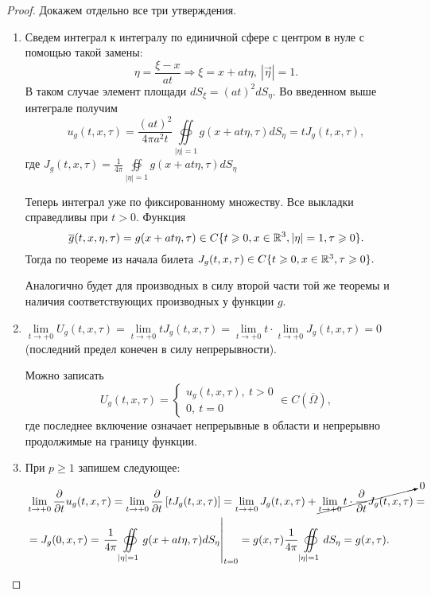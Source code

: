 \documentclass[../main.tex]{subfiles}
\begin{document}
\begin{proof} Докажем отдельно все три утверждения.
\begin{enumerate}
\item Сведем интеграл к интегралу по единичной сфере с центром в нуле с помощью такой замены:
\[
\eta = \frac{\xi - x}{at}\Rightarrow \xi = x+at\eta ,\ |\vec{\eta} |=1.
\]
В таком случае элемент площади $dS_{\xi}=(at)^2dS_{\eta}$. Во введенном выше интеграле получим 
\[
u_g(t,x,\tau)=\frac{(at)^2}{4\pi a^2t}\oiint\limits_{|\eta |=1}g(x+at\eta ,\tau ) dS_{\eta}=tJ_g(t,x,\tau ),
\]
где $\displaystyle J_g(t,x,\tau )= \frac{1}{4\pi}\oiint\limits_{|\eta |=1}g(x+at\eta ,\tau ) dS_{\eta}$

Теперь интеграл уже по фиксированному множеству. Все выкладки справедливы при $t>0$. Функция
\[
\overline{g}(t,x,\eta ,\tau)=g(x+at\eta, \tau)\in C\{t\geqslant 0, x\in \mathbb{R}^3 , |\eta | = 1, \tau\geqslant 0\}.
\]
Тогда по теореме из начала билета $J_g(t,x,\tau )\in C\{t\geqslant 0, x\in \mathbb{R}^3,\tau\geqslant 0\}.$

Аналогично будет для производных в силу второй части той же теоремы и наличия соответствующих производных у функции $g$.

\item $\lim\limits_{t\rightarrow +0}U_g(t,x,\tau )=\lim\limits_{t\rightarrow +0}tJ_g(t,x,\tau )=\lim\limits_{t\rightarrow +0}t\cdot\lim\limits_{t\rightarrow +0}J_g(t,x,\tau ) = 0$ (последний предел конечен в силу непрерывности).

Можно записать
\[
U_g(t,x,\tau ) = \begin{cases}
u_g(t,x, \tau ),\ t>0\\
0,\ t=0
\end{cases} \in C\left(\overline{\Omega} \right),
\]
где последнее включение означает непрерывные в области и непрерывно продолжимые на границу функции.

\item При $p\geq 1$ запишем следующее:
\begin{equation*}
\begin{split}
&\lim\limits_{t\rightarrow +0}\frac{\partial}{\partial t} u_g(t,x, \tau) = \lim\limits_{t\rightarrow +0}\frac{\partial}{\partial t}\left[tJ_g(t,x,\tau )\right]=\lim\limits_{t\rightarrow +0}J_g(t,x,\tau )+\cancelto{0}{\lim\limits_{t\rightarrow +0}t\cdot \frac{\partial}{\partial t}J_g(t,x,\tau )}=\\
&=J_g(0, x, \tau )=\left.\frac{1}{4\pi}\oiint\limits_{|\eta |=1}g(x+at\eta ,\tau )dS_{\eta }\right|_{t=0}=g(x, \tau )\frac{1}{4\pi}\oiint\limits_{|\eta |=1}dS_{\eta}=g(x,\tau ).
\end{split}
\end{equation*}
\end{enumerate}
\end{proof}
\end{document}
